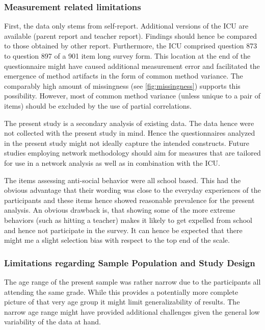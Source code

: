 \subsubsection{Measurement related limitations}
First, the data only stems from self-report. 
Additional versions of the ICU are available (parent report and teacher report).
Findings should hence be compared to those obtained by other report. 
Furthermore, the ICU comprised question 873 to question 897 of a 901 item long survey form.
This location at the end of the questionnaire might have caused additional measurement error and facilitated the emergence of method artifacts in the form of common method variance.
The comparably high amount of missingness (see \ref{fig:missingness}) supports this possibility.
However, most of common method variance (unless unique to a pair of items) should be excluded by the use of partial correlations.

The present study is a secondary analysis of existing data. 
The data hence were not collected with the present study in mind. 
Hence the questionnaires analyzed in the present study might not ideally capture the intended constructs.
Future studies employing network methodology should aim for measures that are tailored for use in a network analysis as well as in combination with the ICU.

The items assessing anti-social behavior were all school based. 
This had the obvious advantage that their wording was close to the everyday experiences of the participants and these items hence showed reasonable prevalence for the present analysis.
An obvious drawback is, that showing some of the more extreme behaviors (such as hitting a teacher) makes it likely to get expelled from school and hence not participate in the survey.
It can hence be expected that there might me a slight selection bias with respect to the top end of the scale.


\subsubsection{Limitations regarding Sample Population and Study Design}

The age range of the present sample was rather narrow due to the participants all attending the same grade.
While this provides a potentially more complete picture of that very age group it might limit generalizability of results.
The narrow age range might have provided additional challenges given the general low variability of the data at hand.

